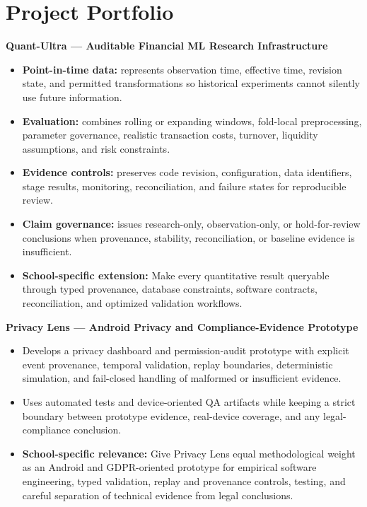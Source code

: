 \documentclass[11pt]{article}
\begin{document}
\section*{Project Portfolio}
\textbf{Quant-Ultra --- Auditable Financial ML Research Infrastructure}
\begin{itemize}
\item \textbf{Point-in-time data:} represents observation time, effective time, revision state, and permitted transformations so historical experiments cannot silently use future information.
\item \textbf{Evaluation:} combines rolling or expanding windows, fold-local preprocessing, parameter governance, realistic transaction costs, turnover, liquidity assumptions, and risk constraints.
\item \textbf{Evidence controls:} preserves code revision, configuration, data identifiers, stage results, monitoring, reconciliation, and failure states for reproducible review.
\item \textbf{Claim governance:} issues research-only, observation-only, or hold-for-review conclusions when provenance, stability, reconciliation, or baseline evidence is insufficient.
\item \textbf{School-specific extension:} Make every quantitative result queryable through typed provenance, database constraints, software contracts, reconciliation, and optimized validation workflows.
\end{itemize}

\textbf{Privacy Lens --- Android Privacy and Compliance-Evidence Prototype}
\begin{itemize}
\item Develops a privacy dashboard and permission-audit prototype with explicit event provenance, temporal validation, replay boundaries, deterministic simulation, and fail-closed handling of malformed or insufficient evidence.
\item Uses automated tests and device-oriented QA artifacts while keeping a strict boundary between prototype evidence, real-device coverage, and any legal-compliance conclusion.
\item \textbf{School-specific relevance:} Give Privacy Lens equal methodological weight as an Android and GDPR-oriented prototype for empirical software engineering, typed validation, replay and provenance controls, testing, and careful separation of technical evidence from legal conclusions.
\end{itemize}
\end{document}
